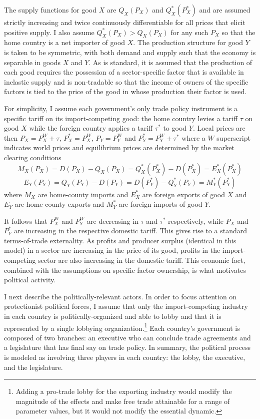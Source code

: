 \documentclass[authoryear, review]{elsarticle}
\begin{document}
The supply functions for good $X$ are $Q_X(P_X)$ and $Q_X^*(P_X^*)$ and are assumed strictly increasing and twice continuously differentiable for all prices that elicit positive supply. I also assume $Q_X^*(P_X) > Q_X(P_X)$ for any such $P_X$ so that the home country is a net importer of good $X$. The production structure for good $Y$ is taken to be symmetric, with both demand and supply such that the economy is separable in goods $X$ and $Y$. As is standard, it is assumed that the production of each good requires the possession of a sector-specific factor that is available in inelastic supply and is non-tradable so that the income of owners of the specific factors is tied to the price of the good in whose production their factor is used.

For simplicity, I assume each government's only trade policy instrument is a specific tariff on its import-competing good: the home country levies a tariff $\tau$ on good $X$ while the foreign country applies a tariff $\tau^*$ to good $Y$. Local prices are then $P_X = P_X^W + \tau$, $P_X^* = P_X^W$, $P_Y = P_Y^W$ and $P_Y^* = P_Y^W + \tau^*$ where a $W$ superscript indicates world prices and equilibrium prices are determined by the market clearing conditions
$$M_X(P_X)= D(P_X)-Q_X(P_X) = Q_X^*(P_X^*) - D(P_X^*) = E_X^*(P_X^*)$$
$$E_Y(P_Y)=Q_Y(P_Y)-D(P_Y) = D(P_Y^*)-Q_Y^*(P_Y) = M_Y^*(P_Y^*)$$
where $M_X$ are home-county imports and $E_X^*$ are foreign exports of good $X$ and $E_Y$ are home-county exports and $M_Y^*$ are foreign imports of good $Y$.

It follows that $P_X^W$ and $P_Y^W$ are decreasing in $\tau$ and $\tau^*$ respectively, while $P_X$ and $P_Y^*$ are increasing in the respective domestic tariff. This gives rise to a standard terms-of-trade externality. As profits and producer surplus (identical in this model) in a sector are increasing in the price of its good, profits in the import-competing sector are also increasing in the domestic tariff. This economic fact, combined with the assumptions on specific factor ownership, is what motivates political activity.

I next describe the politically-relevant actors. In order to focus attention on protectionist political forces, I assume that only the import-competing industry in each country is politically-organized and able to lobby and that it is represented by a single lobbying organization.\footnote{Adding a pro-trade lobby for the exporting industry would modify the magnitude of the effects and make free trade attainable for a range of parameter values, but it would not modify the essential dynamic.} Each country's government is composed of two branches: an executive who can conclude trade agreements and a legislature that has final say on trade policy. In summary, the political process is modeled as involving three players in each country: the lobby, the executive, and the legislature.
\end{document}
